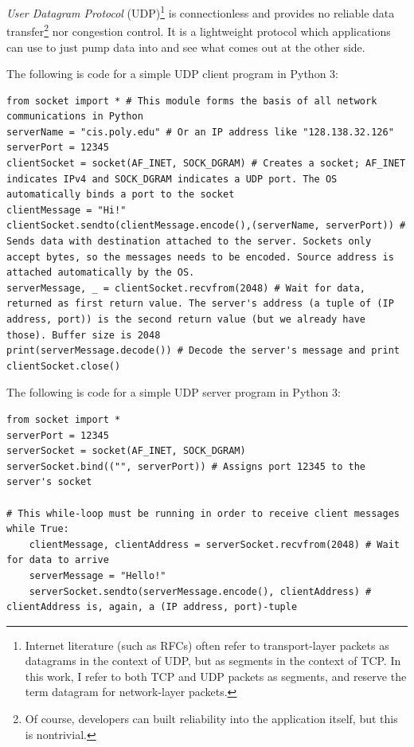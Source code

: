 \documentclass[table, xcdraw]{article}%
\begin{document}
\emph{User Datagram Protocol} (UDP)\footnote{Internet literature (such as RFCs) often refer to transport-layer packets as datagrams in the context of UDP, but as segments in the context of TCP. In this work, I refer to both TCP and UDP packets as segments, and reserve the term datagram for network-layer packets.} is connectionless and provides no reliable data transfer\footnote{Of course, developers can built reliability into the application itself, but this is nontrivial.} nor congestion control. It is a lightweight protocol which applications can use to just pump data into and see what comes out at the other side.

The following is code for a simple UDP client program in Python 3:

\begin{verbatim}
from socket import * # This module forms the basis of all network communications in Python
serverName = "cis.poly.edu" # Or an IP address like "128.138.32.126"
serverPort = 12345
clientSocket = socket(AF_INET, SOCK_DGRAM) # Creates a socket; AF_INET indicates IPv4 and SOCK_DGRAM indicates a UDP port. The OS automatically binds a port to the socket
clientMessage = "Hi!"
clientSocket.sendto(clientMessage.encode(),(serverName, serverPort)) # Sends data with destination attached to the server. Sockets only accept bytes, so the messages needs to be encoded. Source address is attached automatically by the OS.
serverMessage, _ = clientSocket.recvfrom(2048) # Wait for data, returned as first return value. The server's address (a tuple of (IP address, port)) is the second return value (but we already have those). Buffer size is 2048
print(serverMessage.decode()) # Decode the server's message and print
clientSocket.close()
\end{verbatim}

The following is code for a simple UDP server program in Python 3:

\begin{verbatim}
from socket import *
serverPort = 12345
serverSocket = socket(AF_INET, SOCK_DGRAM)
serverSocket.bind(("", serverPort)) # Assigns port 12345 to the server's socket

# This while-loop must be running in order to receive client messages
while True:
    clientMessage, clientAddress = serverSocket.recvfrom(2048) # Wait for data to arrive
    serverMessage = "Hello!"
    serverSocket.sendto(serverMessage.encode(), clientAddress) # clientAddress is, again, a (IP address, port)-tuple
\end{verbatim}
\end{document}
